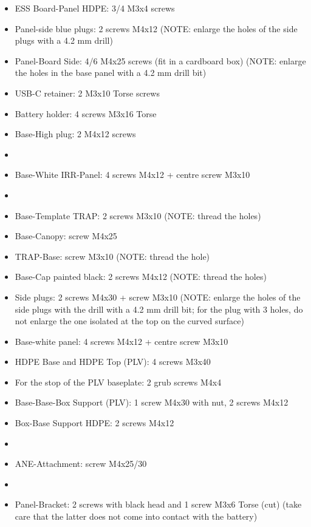 \begin{itemize}
    \item ESS Board-Panel HDPE: 3/4 M3x4 screws
    \item  Panel-side blue plugs: 2 screws M4x12 (NOTE: enlarge the holes of the side plugs with a 4.2 mm drill)
    \item  Panel-Board Side: 4/6 M4x25 screws (fit in a cardboard box) (NOTE: enlarge the holes in the base panel with a 4.2 mm drill bit)
    \item USB-C retainer: 2 M3x10 Torse screws
    \item Battery holder: 4 screws M3x16 Torse
    \item Base-High plug: 2 M4x12 screws
    \item []
    \item  Base-White IRR-Panel: 4 screws M4x12 + centre screw M3x10
    \item []
    \item  Base-Template TRAP: 2 screws M3x10 (NOTE: thread the holes)
    \item  Base-Canopy: screw M4x25
    \item  TRAP-Base: screw M3x10 (NOTE: thread the hole)
    \item  Base-Cap painted black: 2 screws M4x12 (NOTE: thread the holes)
    \item  Side plugs: 2 screws M4x30 + screw M3x10 (NOTE: enlarge the holes of the side plugs with the drill with a 4.2 mm drill bit; for the plug with 3 holes, do not enlarge the one isolated at the top on the curved surface)
    \item  Base-white panel: 4 screws M4x12 + centre screw M3x10
    \item  HDPE Base and HDPE Top (PLV): 4 screws M3x40
    \item For the stop of the PLV baseplate: 2 grub screws M4x4
    \item Base-Base-Box Support (PLV): 1 screw M4x30 with nut, 2 screws M4x12
    \item Box-Base Support HDPE: 2 screws M4x12
    \item []
    \item  ANE-Attachment: screw M4x25/30
    \item []
    \item  Panel-Bracket: 2 screws with black head and 1 screw M3x6 Torse (cut) (take care that the latter does not come into contact with the battery)
    
\end{itemize}    
    
